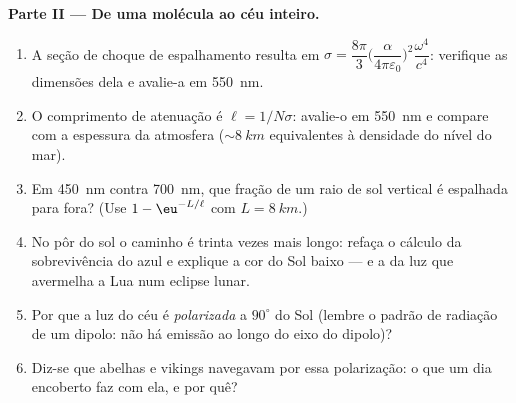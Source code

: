 \begin{problem}
\medskip\noindent\textbf{Parte II --- De uma molécula ao céu
inteiro.}
\begin{enumerate}[resume]
  \item A seção de choque de espalhamento resulta em $\sigma =
        \dfrac{8\pi}{3}\Big(\dfrac{\alpha}{4\pi\varepsilon_0}
        \Big)^2\dfrac{\omega^4}{c^4}$: verifique as dimensões dela e
        avalie-a em \qty{550}{nm}.
  \item O comprimento de atenuação é $\ell = 1/N\sigma$: avalie-o em
        \qty{550}{nm} e compare com a espessura da atmosfera
        ($\sim\qty{8}{km}$ equivalentes à densidade do nível do mar).
  \item Em \qty{450}{nm} contra \qty{700}{nm}, que fração de um raio de
        sol vertical é espalhada para fora? (Use $1 -
        \eu^{-L/\ell}$ com $L = \qty{8}{km}$.)
  \item No pôr do sol o caminho é trinta vezes mais longo: refaça o
        cálculo da sobrevivência do azul e explique a cor do Sol baixo
        --- e a da luz que avermelha a Lua num eclipse lunar.
  \item Por que a luz do céu é \emph{polarizada} a $90^\circ$ do Sol
        (lembre o padrão de radiação de um dipolo: não há emissão ao
        longo do eixo do dipolo)?
  \item Diz-se que abelhas e vikings navegavam por essa polarização: o
        que um dia encoberto faz com ela, e por quê?
\end{enumerate}


\end{problem}
